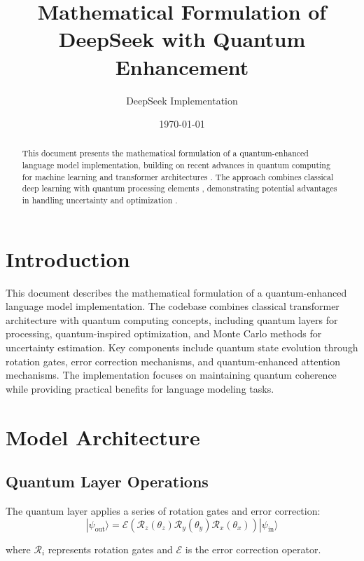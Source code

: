 \documentclass{article}
\title{Mathematical Formulation of DeepSeek with Quantum Enhancement}
\author{DeepSeek Implementation}
\date{\today}
\begin{document}
\maketitle

\begin{abstract}
This document presents the mathematical formulation of a quantum-enhanced language model implementation, building on recent advances in quantum computing for machine learning \citep{bharti2022noisy} and transformer architectures \citep{vaswani2017attention}. The approach combines classical deep learning with quantum processing elements \citep{schuld2019quantum}, demonstrating potential advantages in handling uncertainty \citep{gal2016dropout} and optimization \citep{farhi2018classification}.
\end{abstract}

\section*{Introduction}
This document describes the mathematical formulation of a quantum-enhanced language model implementation. The codebase combines classical transformer architecture with quantum computing concepts, including quantum layers for processing, quantum-inspired optimization, and Monte Carlo methods for uncertainty estimation. Key components include quantum state evolution through rotation gates, error correction mechanisms, and quantum-enhanced attention mechanisms. The implementation focuses on maintaining quantum coherence while providing practical benefits for language modeling tasks.

\section{Model Architecture}

\subsection{Quantum Layer Operations}
The quantum layer applies a series of rotation gates and error correction:
\begin{equation}
|\psi_{\text{out}}\rangle = \mathcal{E}(\mathcal{R}_z(\theta_z)\mathcal{R}_y(\theta_y)\mathcal{R}_x(\theta_x))|\psi_{\text{in}}\rangle
\end{equation}

where $\mathcal{R}_i$ represents rotation gates and $\mathcal{E}$ is the error correction operator.
\end{document}
